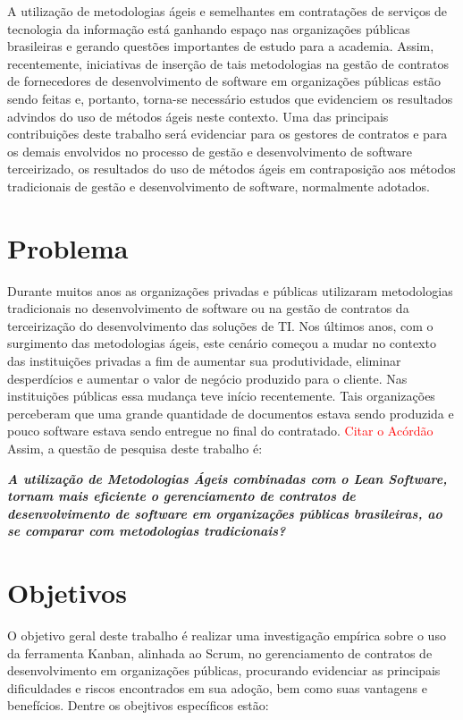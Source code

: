 A utilização de metodologias ágeis e semelhantes em contratações de serviços de tecnologia da informação está ganhando espaço nas organizações públicas brasileiras e gerando questões importantes de estudo para a academia. Assim, recentemente, iniciativas de inserção de tais metodologias na gestão de contratos de fornecedores de desenvolvimento de software em organizações públicas estão sendo feitas e, portanto, torna-se necessário estudos que evidenciem os resultados advindos do uso de métodos ágeis neste contexto. Uma das principais contribuições deste trabalho será evidenciar para os gestores de contratos e para os demais envolvidos no processo de gestão e desenvolvimento de software terceirizado, os resultados do uso de métodos ágeis em contraposição aos métodos tradicionais de gestão e desenvolvimento de software, normalmente adotados. 

\section[Problema]{Problema}

Durante muitos anos as organizações privadas e públicas utilizaram metodologias tradicionais no desenvolvimento de software ou na gestão de contratos da terceirização do desenvolvimento das soluções de TI. Nos últimos anos, com o surgimento das metodologias ágeis, este cenário começou a mudar no contexto das instituições privadas a fim de aumentar sua produtividade, eliminar desperdícios e aumentar o valor de negócio produzido para o cliente. Nas instituições públicas essa mudança teve início recentemente. Tais organizações perceberam que uma grande quantidade de documentos estava sendo produzida e pouco software estava sendo entregue no final do contratado. \textcolor{red}{Citar o Acórdão} Assim, a questão de pesquisa deste trabalho é:

\textit{\textbf {A utilização de Metodologias Ágeis combinadas com o Lean Software, tornam mais eficiente o gerenciamento de contratos de desenvolvimento de software em organizações públicas brasileiras, ao se comparar com metodologias tradicionais?}}

\section[Objetivos]{Objetivos}

O objetivo geral deste trabalho é realizar uma investigação empírica sobre o uso da ferramenta Kanban, alinhada ao Scrum, no gerenciamento de contratos de desenvolvimento em organizações públicas, procurando evidenciar as principais dificuldades e riscos encontrados em sua adoção, bem como suas vantagens e benefícios. Dentre os obejtivos específicos estão:

